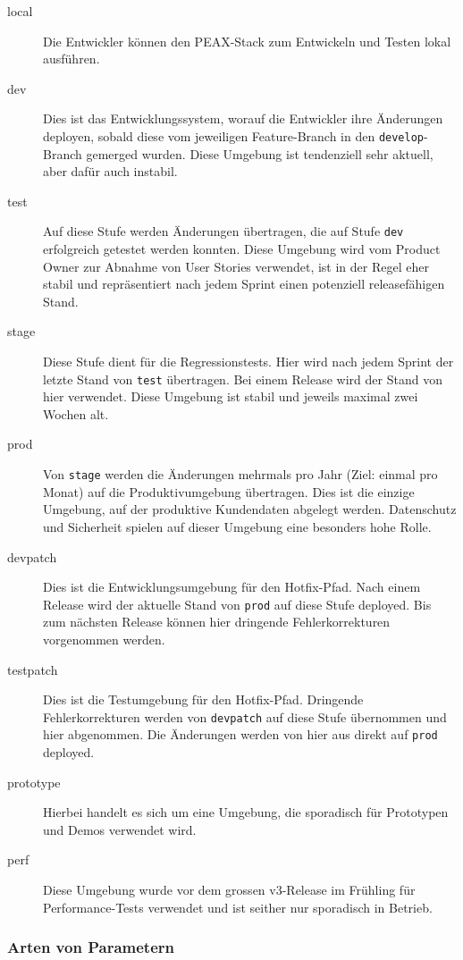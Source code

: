 \begin{description}
    \item[local] Die Entwickler können den PEAX-Stack zum Entwickeln und Testen lokal ausführen.
    \item[dev] Dies ist das Entwicklungssystem, worauf die Entwickler ihre Änderungen deployen, sobald diese vom jeweiligen Feature-Branch in den \texttt{develop}-Branch gemerged wurden. Diese Umgebung ist tendenziell sehr aktuell, aber dafür auch instabil.
    \item[test] Auf diese Stufe werden Änderungen übertragen, die auf Stufe \texttt{dev} erfolgreich getestet werden konnten. Diese Umgebung wird vom Product Owner zur Abnahme von User Stories verwendet, ist in der Regel eher stabil und repräsentiert nach jedem Sprint einen potenziell releasefähigen Stand.
    \item[stage] Diese Stufe dient für die Regressionstests. Hier wird nach jedem Sprint der letzte Stand von \texttt{test} übertragen. Bei einem Release wird der Stand von hier verwendet. Diese Umgebung ist stabil und jeweils maximal zwei Wochen alt.
    \item[prod] Von \texttt{stage} werden die Änderungen mehrmals pro Jahr (Ziel: einmal pro Monat) auf die Produktivumgebung übertragen. Dies ist die einzige Umgebung, auf der produktive Kundendaten abgelegt werden. Datenschutz und Sicherheit spielen auf dieser Umgebung eine besonders hohe Rolle.
    \item[devpatch] Dies ist die Entwicklungsumgebung für den Hotfix-Pfad. Nach einem Release wird der aktuelle Stand von \texttt{prod} auf diese Stufe deployed. Bis zum nächsten Release können hier dringende Fehlerkorrekturen vorgenommen werden.
    \item[testpatch] Dies ist die Testumgebung für den Hotfix-Pfad. Dringende Fehlerkorrekturen werden von \texttt{devpatch} auf diese Stufe übernommen und hier abgenommen. Die Änderungen werden von hier aus direkt auf \texttt{prod} deployed.
    \item[prototype] Hierbei handelt es sich um eine Umgebung, die sporadisch für Prototypen und Demos verwendet wird.
    \item[perf] Diese Umgebung wurde vor dem grossen v3-Release im Frühling für Performance-Tests verwendet und ist seither nur sporadisch in Betrieb.
\end{description}

\subsubsection{Arten von Parametern}

